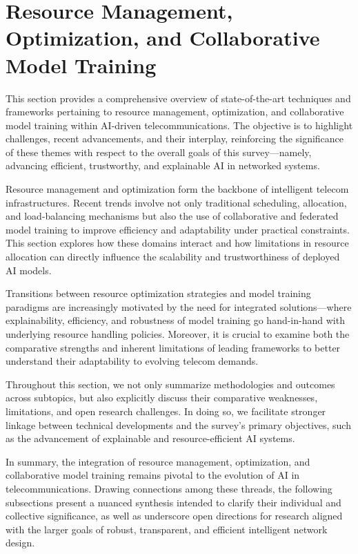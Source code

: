 \documentclass[sigconf]{acmart}
\begin{document}
\section{Resource Management, Optimization, and Collaborative Model Training}
\label{sec:resource_management}

This section provides a comprehensive overview of state-of-the-art techniques and frameworks pertaining to resource management, optimization, and collaborative model training within AI-driven telecommunications. The objective is to highlight challenges, recent advancements, and their interplay, reinforcing the significance of these themes with respect to the overall goals of this survey---namely, advancing efficient, trustworthy, and explainable AI in networked systems.

Resource management and optimization form the backbone of intelligent telecom infrastructures. Recent trends involve not only traditional scheduling, allocation, and load-balancing mechanisms but also the use of collaborative and federated model training to improve efficiency and adaptability under practical constraints. This section explores how these domains interact and how limitations in resource allocation can directly influence the scalability and trustworthiness of deployed AI models.

Transitions between resource optimization strategies and model training paradigms are increasingly motivated by the need for integrated solutions—where explainability, efficiency, and robustness of model training go hand-in-hand with underlying resource handling policies. Moreover, it is crucial to examine both the comparative strengths and inherent limitations of leading frameworks to better understand their adaptability to evolving telecom demands.

Throughout this section, we not only summarize methodologies and outcomes across subtopics, but also explicitly discuss their comparative weaknesses, limitations, and open research challenges. In doing so, we facilitate stronger linkage between technical developments and the survey’s primary objectives, such as the advancement of explainable and resource-efficient AI systems.

In summary, the integration of resource management, optimization, and collaborative model training remains pivotal to the evolution of AI in telecommunications. Drawing connections among these threads, the following subsections present a nuanced synthesis intended to clarify their individual and collective significance, as well as underscore open directions for research aligned with the larger goals of robust, transparent, and efficient intelligent network design.
\end{document}
